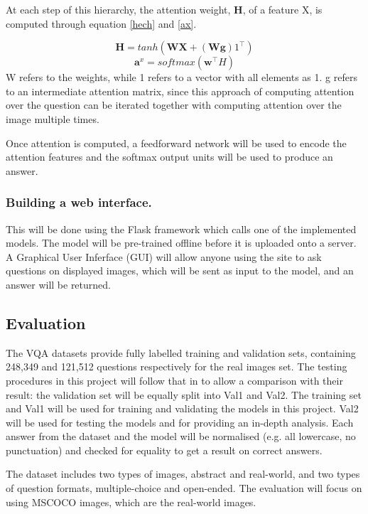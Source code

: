 \documentclass[12pt,a4paper,twoside]{article}
\begin{document}
At each step of this hierarchy, the attention weight, \textbf{H}, of a feature X,  is computed through equation \ref{hech} and \ref{ax}.

\begin{equation}\label{hech}
\textbf{H} = tanh(\textbf{WX} + (\textbf{Wg})1^\top)
\end{equation} 
\begin{equation}\label{ax}
\textbf{a}^x = softmax(\textbf{w}^\top H)
\end{equation}
W refers to the weights, while 1 refers to a vector with all elements as 1. g refers to an intermediate attention matrix, since this approach of computing attention over the question can be iterated together with computing attention over the image multiple times.

Once attention is computed, a feedforward network will be used to encode the attention features and the softmax output units will be used to produce an answer.

\subsubsection{Building a web interface.}
This will be done using the Flask framework which calls one of the implemented models. The model will be pre-trained offline before it is uploaded onto a server. A Graphical User Inferface (GUI) will allow anyone using the site to ask questions on displayed images, which will be sent as input to the model, and an answer will be returned.

\subsection{Evaluation}

The VQA datasets provide fully labelled training and validation sets, containing 248,349 and 121,512 questions respectively for the real images set. The testing procedures in this project will follow that in \cite{SAN} to allow a comparison with their result: the validation set will be equally split into Val1 and Val2. The training set and Val1 will be used for training and validating the models in this project. Val2 will be used for testing the models and for providing an in-depth analysis. Each answer from the dataset and the model will be normalised (e.g. all lowercase, no punctuation) and checked for equality to get a result on correct answers. 

The dataset includes two types of images, abstract and real-world, and two types of question formats, multiple-choice and open-ended. The evaluation will focus on using MSCOCO images, which are the real-world images. 
\end{document}
